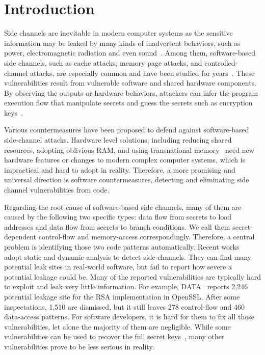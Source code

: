 \section{Introduction}
Side channels are inevitable in modern computer systems as the sensitive information 
may be leaked by many kinds of inadvertent behaviors, 
such as power, electromagnetic radiation and even sound~\cite{xxx}. 
Among them, software-based side channels, such as cache attacks, memory page attacks,
and controlled-channel attacks, are especially common 
and have been studied for years~\cite{xxx}. 
These vulnerabilities result from vulnerable software and shared hardware components.
By observing the outputs or hardware behaviors, attackers can
infer the program execution flow that manipulate secrets and 
guess the secrets such as encryption keys~\cite{xxx}.

Various countermeasures have been proposed to defend against 
software-based side-channel attacks. Hardware level solutions, 
including reducing shared resources, adopting oblivious RAM, and using
transnational memory~\cite{182946,203878,217537} need new hardware features or changes
to modern complex computer systems, which is impractical and hard to adopt in 
reality. Therefore, a more promising and universal direction is software countermeasures, 
detecting and eliminating side channel vulnerabilities from code.

Regarding the root cause of software-based side channels, 
many of them are caused by the following two specific types: 
data flow from secrets to load addresses and data flow from secrets to branch conditions.
We call them secret-dependent control-flow and memory-access correspondingly.
Therefore, a central problem is identifying those two code patterns automatically.
Recent works~\cite{203878,data,caches} adopt static and dynamic analysis
to detect side-channels.
They can find many potential leak sites in real-world software, 
but fail to report how severe a potential leakage could be. 
Many of the reported vulnerabilities are typically hard to exploit
and leak very little information. For example, DATA~\cite{xxx} reports
2,246 potential leakage site for the RSA implementation in OpenSSL\@.
After some inspectations, 1,510 are dismissed, but it still
leaves 278 control-flow and 460 data-access patterns. For software
developers, it is hard for them to fix all those vulnerabilities,
let alone the majority of them are negligible.
While some vulnerabilities can be used to recover the full secret
keys~\cite{xxx}, many other vulnerabilities prove to be less serious in reality.

